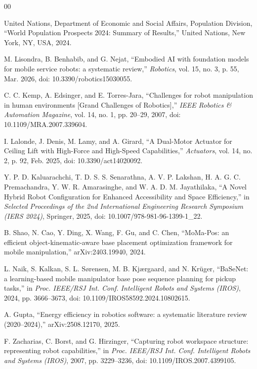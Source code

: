 \documentclass[conference]{IEEEtran}
\begin{document}
{\scriptsize
\begin{thebibliography}{00}

United Nations, Department of Economic and Social Affairs, Population Division, ``World Population Prospects 2024: Summary of Results,'' United Nations, New York, NY, USA, 2024.

M. Lisondra, B. Benhabib, and G. Nejat, ``Embodied AI with foundation models for mobile service robots: a systematic review,'' \textit{Robotics}, vol. 15, no. 3, p. 55, Mar. 2026, doi: 10.3390/robotics15030055.

C. C. Kemp, A. Edsinger, and E. Torres-Jara, ``Challenges for robot manipulation in human environments [Grand Challenges of Robotics],'' \textit{IEEE Robotics \& Automation Magazine}, vol. 14, no. 1, pp. 20--29, 2007, doi: 10.1109/MRA.2007.339604.

I. Lalonde, J. Denis, M. Lamy, and A. Girard, ``A Dual-Motor Actuator for Ceiling Lift with High-Force and High-Speed Capabilities,'' \textit{Actuators}, vol. 14, no. 2, p. 92, Feb. 2025, doi: 10.3390/act14020092.

Y. P. D. Kaluarachchi, T. D. S. S. Senarathna, A. V. P. Lakshan, H. A. G. C. Premachandra, Y. W. R. Amarasinghe, and W. A. D. M. Jayathilaka, ``A Novel Hybrid Robot Configuration for Enhanced Accessibility and Space Efficiency,'' in \textit{Selected Proceedings of the 2nd International Engineering Research Symposium (IERS 2024)}, Springer, 2025, doi: 10.1007/978-981-96-1399-1\_22.

B. Shao, N. Cao, Y. Ding, X. Wang, F. Gu, and C. Chen, ``MoMa-Pos: an efficient object-kinematic-aware base placement optimization framework for mobile manipulation,'' arXiv:2403.19940, 2024.

L. Naik, S. Kalkan, S. L. S{\o}rensen, M. B. Kj{\ae}rgaard, and N. Kr{\"u}ger, ``BaSeNet: a learning-based mobile manipulator base pose sequence planning for pickup tasks,'' in \textit{Proc. IEEE/RSJ Int. Conf. Intelligent Robots and Systems (IROS)}, 2024, pp. 3666--3673, doi: 10.1109/IROS58592.2024.10802615.

A. Gupta, ``Energy efficiency in robotics software: a systematic literature review (2020--2024),'' arXiv:2508.12170, 2025.

F. Zacharias, C. Borst, and G. Hirzinger, ``Capturing robot workspace structure: representing robot capabilities,'' in \textit{Proc. IEEE/RSJ Int. Conf. Intelligent Robots and Systems (IROS)}, 2007, pp. 3229--3236, doi: 10.1109/IROS.2007.4399105.


\end{thebibliography}}
\end{document}
